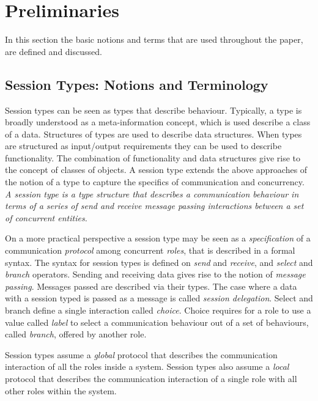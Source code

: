 \section{Preliminaries}
\label{sec:preliminaries}

In this section the basic notions and terms that are used throughout
the paper, are defined and discussed.

\subsection{Session Types: Notions and Terminology}

Session types can be seen as types that describe behaviour.
Typically, a type is broadly understood
as a meta-information concept, which is used describe a class of a data.
Structures of types are used to describe data structures.
When types are structured as input/output requirements they
can be used to describe functionality. The combination of
functionality and data structures give rise to the concept
of classes of objects.
%
A session type extends the above approaches of
the notion of a type to capture the specifics of communication and concurrency.
{\em A session type is a type structure that describes a communication
behaviour in terms of a series of send and receive message passing
interactions between a set of concurrent entities.}
%

On a more practical perspective a session type may be seen as a
{\em specification} of a communication {\em protocol} among concurrent {\em roles},
that is described in a formal syntax.
The syntax for session types is defined on {\em send} and {\em receive}, and {\em select} and {\em branch}
operators.
Sending and receiving data gives rise to the notion of {\em message passing}.
Messages passed are described via their types.
The case where a data with a session typed is passed as a message
is called {\em session delegation}.
Select and branch define a single interaction called {\em choice}.
Choice requires for a role to use a value called {\em label}
to select a communication behaviour out of a set of behaviours, called {\em branch},
offered by another role.

Session types assume a {\em global} protocol that describes the
communication interaction of all the roles inside a system.
Session types also assume a {\em local} protocol that describes the
communication interaction of a single role with all other roles within the system.

